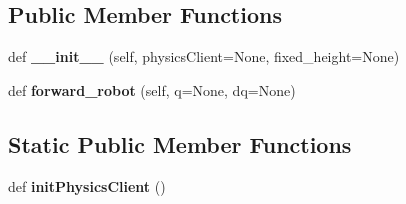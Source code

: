 \subsection*{Public Member Functions}
\begin{DoxyCompactItemize}
\item 
def {\bfseries \+\_\+\+\_\+init\+\_\+\+\_\+} (self, physics\+Client=None, fixed\+\_\+height=None)\hypertarget{classpy__robot__properties__teststand_1_1teststand__wrapper_1_1TeststandRobot_a627d6d55ef3784570f85bd3f6f683e28}{}\label{classpy__robot__properties__teststand_1_1teststand__wrapper_1_1TeststandRobot_a627d6d55ef3784570f85bd3f6f683e28}

\item 
def {\bfseries forward\+\_\+robot} (self, q=None, dq=None)\hypertarget{classpy__robot__properties__teststand_1_1teststand__wrapper_1_1TeststandRobot_aae85594daabfb7a0b44731b2dab5ce5e}{}\label{classpy__robot__properties__teststand_1_1teststand__wrapper_1_1TeststandRobot_aae85594daabfb7a0b44731b2dab5ce5e}

\end{DoxyCompactItemize}
\subsection*{Static Public Member Functions}
\begin{DoxyCompactItemize}
\item 
def {\bfseries init\+Physics\+Client} ()\hypertarget{classpy__robot__properties__teststand_1_1teststand__wrapper_1_1TeststandRobot_ab700000fd34f7e37de71798e7fdb76b7}{}\label{classpy__robot__properties__teststand_1_1teststand__wrapper_1_1TeststandRobot_ab700000fd34f7e37de71798e7fdb76b7}

\end{DoxyCompactItemize}
